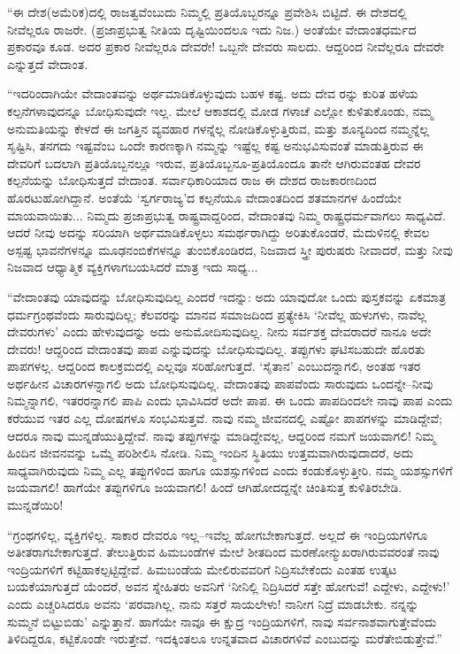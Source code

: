 “ಈ ದೇಶ(ಅಮೆರಿಕ)ದಲ್ಲಿ ರಾಜತ್ವವೆಂಬುದು ನಿಮ್ಮಲ್ಲಿ ಪ್ರತಿಯೊಬ್ಬರನ್ನೂ ಪ್ರವೇಶಿಸಿ ಬಿಟ್ಟಿದೆ. ಈ ದೇಶದಲ್ಲಿ ನೀವೆಲ್ಲರೂ ರಾಜರೇ. (ಪ್ರಜಾಪ್ರಭುತ್ವ ನೀತಿಯ ದೃಷ್ಟಿಯಿಂದಲೂ ಇದು ನಿಜ.) ಅಂತೆಯೇ ವೇದಾಂತಧರ್ಮದ ಪ್ರಕಾರವೂ ಕೂಡ. ಅದರ ಪ್ರಕಾರ ನೀವೆಲ್ಲರೂ ದೇವರೇ! ಒಬ್ಬನೇ ದೇವರು ಸಾಲದು. ಆದ್ದರಿಂದ ನೀವೆಲ್ಲರೂ ದೇವರೇ ಎನ್ನುತ್ತದೆ ವೇದಾಂತ.

“ಇದರಿಂದಾಗಿಯೇ ವೇದಾಂತವನ್ನು ಅರ್ಥಮಾಡಿಕೊಳ್ಳುವುದು ಬಹಳ ಕಷ್ಟ. ಅದು ದೇವ ರನ್ನು ಕುರಿತ ಹಳೆಯ ಕಲ್ಪನೆಗಳಾವುದನ್ನೂ ಬೋಧಿಸುವುದೇ ಇಲ್ಲ. ಮೇಲೆ ಆಕಾಶದಲ್ಲಿ ಮೋಡ ಗಳಾಚೆ ಎಲ್ಲೋ ಕುಳಿತುಕೊಂಡು, ನಮ್ಮ ಅನುಮತಿಯನ್ನು ಕೇಳದೆ ಈ ಜಗತ್ತಿನ ವ್ಯವಹಾರ ಗಳನ್ನೆಲ್ಲ ನೋಡಿಕೊಳ್ಳುತ್ತಿರುವ, ಮತ್ತು ಶೂನ್ಯದಿಂದ ನಮ್ಮನ್ನೆಲ್ಲ ಸೃಷ್ಟಿಸಿ, ತನಗದು ಇಷ್ಟವೆಂಬ ಒಂದೇ ಕಾರಣಕ್ಕಾಗಿ ನಮ್ಮನ್ನು ಇಷ್ಟೆಲ್ಲ ಕಷ್ಟ ಅನುಭವಿಸುವಂತೆ ಮಾಡುತ್ತಿರುವ ಈ ದೇವರಿಗೆ ಬದಲಾಗಿ ಪ್ರತಿಯೊಬ್ಬನಲ್ಲೂ ಇರುವ, ಪ್ರತಿಯೊಬ್ಬನೂ-ಪ್ರತಿಯೊಂದೂ ತಾನೇ ಆಗಿರುವಂತಹ ದೇವರ ಕಲ್ಪನೆಯನ್ನು ಬೋಧಿಸುತ್ತದೆ ವೇದಾಂತ. ಸರ್ವಾಧಿಕಾರಿಯಾದ ರಾಜ ಈ ದೇಶದ ರಾಜಕಾರಣದಿಂದ ಹೊರಟುಹೋಗಿದ್ದಾನೆ. ಅಂತೆಯೆ ‘ಸ್ವರ್ಗರಾಜ್ಯ’ದ ಕಲ್ಪನೆಯೂ ವೇದಾಂತದಿಂದ ಶತಮಾನಗಳ ಹಿಂದೆಯೇ ಮಾಯವಾಯಿತು... ನಿಮ್ಮದು ಪ್ರಜಾಪ್ರಭುತ್ವ ರಾಷ್ಟ್ರವಾದ್ದರಿಂದ, ವೇದಾಂತವು ನಿಮ್ಮ ರಾಷ್ಟ್ರಧರ್ಮವಾಗಲು ಸಾಧ್ಯವಿದೆ. ಆದರೆ ನೀವು ಅದನ್ನು ಸರಿಯಾಗಿ ಅರ್ಥಮಾಡಿಕೊಳ್ಳಲು ಸಮರ್ಥರಾಗಿದ್ದು ಅರಿತುಕೊಂಡರೆ, ಮೆದುಳಿನಲ್ಲಿ ಕೇವಲ ಅಸ್ಪಷ್ಟ ಭಾವನೆಗಳನ್ನೂ ಮೂಢನಂಬಿಕೆಗಳನ್ನೂ ತುಂಬಿಕೊಂಡಿರದ, ನಿಜವಾದ ಸ್ತ್ರೀ ಪುರುಷರು ನೀವಾದರೆ, ಮತ್ತು ನೀವು ನಿಜವಾದ ಆಧ್ಯಾತ್ಮಿಕ ವ್ಯಕ್ತಿಗಳಾಗಬಯಸಿದರೆ ಮಾತ್ರ ಇದು ಸಾಧ್ಯ...

“ವೇದಾಂತವು ಯಾವುದನ್ನು ಬೋಧಿಸುವುದಿಲ್ಲ ಎಂದರೆ ಇದನ್ನು: ಅದು ಯಾವುದೋ ಒಂದು ಪುಸ್ತಕವನ್ನು ಏಕಮಾತ್ರ ಧರ್ಮಗ್ರಂಥವೆಂದು ಸಾರುವುದಿಲ್ಲ; ಕೆಲವರನ್ನು ಮಾನವ ಸಮಾಜದಿಂದ ಪ್ರತ್ಯೇಕಿಸಿ ‘ನೀವೆಲ್ಲ ಹುಳುಗಳು, ನಾವೆಲ್ಲ ದೇವರುಗಳು’ ಎಂದು ಹೇಳುವುದನ್ನು ಅದು ಅನುಮೋದಿಸುವುದಿಲ್ಲ. ನೀನು ಸರ್ವಶಕ್ತ ದೇವರಾದರೆ ನಾನೂ ಅದೇ ದೇವರು! ಆದ್ದರಿಂದ ವೇದಾಂತವು ಪಾಪ ಎನ್ನುವುದನ್ನು ಬೋಧಿಸುವುದಿಲ್ಲ. ತಪ್ಪುಗಳು ಘಟಿಸಬಹುದೇ ಹೊರತು ಪಾಪಗಳಲ್ಲ. ಆದ್ದರಿಂದ ಕಾಲಕ್ರಮದಲ್ಲಿ ಎಲ್ಲವೂ ಸರಿಹೋಗುತ್ತದೆ. ‘ಸೈತಾನ’ ಎಂಬುದನ್ನಾಗಲಿ, ಅಂತಹ ಇತರ ಅರ್ಥಹೀನ ವಿಚಾರಗಳನ್ನಾಗಲಿ ಅದು ಬೋಧಿಸುವುದಿಲ್ಲ. ವೇದಾಂತವು ಪಾಪವೆಂದು ಸಾರುವುದು ಒಂದನ್ನೇ–ನೀವು ನಿಮ್ಮನ್ನಾಗಲಿ, ಇತರರನ್ನಾಗಲಿ ಪಾಪಿ ಎಂದು ಭಾವಿಸಿದರೆ ಅದೇ ಪಾಪ. ಈ ಒಂದು ಪಾಪದಿಂದಲೇ ನಾವು ಪಾಪ ಎಂದು ಕರೆಯುವ ಇತರ ಎಲ್ಲ ದೋಷಗಳೂ ಸಂಭವಿಸುತ್ತವೆ. ನಾವು ನಮ್ಮ ಜೀವನದಲ್ಲಿ ಎಷ್ಟೋ ಪಾಪಗಳನ್ನು ಮಾಡಿದ್ದೇವೆ; ಆದರೂ ನಾವು ಮುನ್ನಡೆಯುತ್ತಿದ್ದೇವೆ. ನಾವು ತಪ್ಪುಗಳನ್ನು ಮಾಡಿದ್ದೇವಲ್ಲ, ಆದ್ದರಿಂದ ನಮಗೆ ಜಯವಾಗಲಿ! ನಿಮ್ಮ ಹಿಂದಿನ ಜೀವನವನ್ನು ಒಮ್ಮೆ ಪರಿಶೀಲಿಸಿ ನೋಡಿ. ನಿಮ್ಮ ಇಂದಿನ ಸ್ಥಿತಿಯು ಉತ್ತಮವಾಗಿರುವುದಾದರೆ, ಅದು ಸಾಧ್ಯವಾಗಿರುವುದು ನಿಮ್ಮ ಎಲ್ಲ ತಪ್ಪುಗಳಿಂದ ಹಾಗೂ ಯಶಸ್ಸುಗಳಿಂದ ಎಂದು ಕಂಡುಕೊಳ್ಳುತ್ತೀರಿ. ನಮ್ಮ ಯಶಸ್ಸುಗಳಿಗೆ ಜಯವಾಗಲಿ! ಹಾಗೆಯೇ ತಪ್ಪುಗಳಿಗೂ ಜಯವಾಗಲಿ! ಹಿಂದೆ ಆಗಿಹೋದದ್ದನ್ನೇ ಚಿಂತಿಸುತ್ತ ಕುಳಿತಿರಬೇಡಿ. ಮುನ್ನಡೆಯಿರಿ!

“ಗ್ರಂಥಗಳಿಲ್ಲ, ವ್ಯಕ್ತಿಗಳಿಲ್ಲ. ಸಾಕಾರ ದೇವರೂ ಇಲ್ಲ–ಇವೆಲ್ಲ ಹೋಗಬೇಕಾಗುತ್ತದೆ. ಅಲ್ಲದೆ ಈ ಇಂದ್ರಿಯಗಳಿಗೂ ಅತೀತರಾಗಬೇಕಾಗುತ್ತದೆ. ತೇಲುತ್ತಿರುವ ಹಿಮಬಂಡೆಗಳ ಮೇಲೆ ಶೀತದಿಂದ ಮರಣೋನ್ಮುಖರಾಗಿರುವವರಂತೆ ನಾವು ಇಂದ್ರಿಯಗಳಿಗೆ ಕಟ್ಟಿಹಾಕಲ್ಪಟ್ಟಿದ್ದೇವೆ. ಹಿಮಬಂಡೆಯ ಮೇಲಿರುವವರಿಗೆ ನಿದ್ರಿಸಬೇಕೆಂದು ಎಂತಹ ಉತ್ಕಟ ಬಯಕೆಯಾಗುತ್ತದೆ ಯೆಂದರೆ, ಅವನ ಸ್ನೇಹಿತರು ಅವನಿಗೆ ‘ನೀನಿಲ್ಲಿ ನಿದ್ರಿಸಿದರೆ ಸತ್ತೇ ಹೋಗುವೆ! ಎದ್ದೇಳು, ಎದ್ದೇಳು!’ ಎಂದು ಎಚ್ಚರಿಸಿದರೂ ಅವನು ‘ಪರವಾಗಿಲ್ಲ, ನಾನು ಸತ್ತರೆ ಸಾಯಲೇಳು! ನಾನೀಗ ನಿದ್ರೆ ಮಾಡಬೇಕು. ನನ್ನನ್ನು ಸುಮ್ಮನೆ ಬಿಟ್ಟುಬಿಡು’ ಎನ್ನುತ್ತಾನೆ. ಹಾಗೆಯೇ ನಾವೂ ಈ ಕ್ಷುದ್ರ ಇಂದ್ರಿಯಗಳಿಗೆ, ನಾವು ಸರ್ವನಾಶವಾಗುತ್ತೇವೆಂದು ತಿಳಿದಿದ್ದರೂ, ಕಟ್ಟಿಕೊಂಡೇ ಇರುತ್ತೇವೆ. ಇದಕ್ಕಿಂತಲೂ ಉನ್ನತವಾದ ವಿಚಾರಗಳಿವೆ ಎಂಬುದನ್ನು ಮರೆತೇಬಿಡುತ್ತೇವೆ.”

